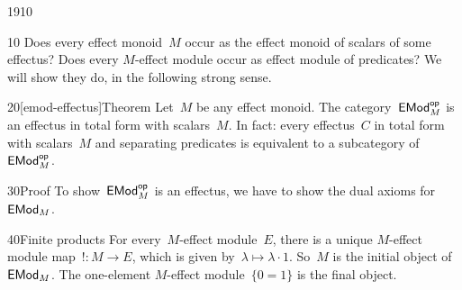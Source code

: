 \begin{parsec}{1910}%
\begin{point}{10}%
Does every effect monoid~$M$ occur as the effect monoid of scalars of some
    effectus?  Does every $M$-effect module occur as
        effect module of predicates?
We will show they do, in the following strong sense.
\end{point}
\begin{point}{20}[emod-effectus]{Theorem}%
    Let~$M$ be any effect monoid.
    The category~$\mathsf{EMod}^{\mathsf{op}}_M$ is an effectus in total form
        with scalars~$M$.
In fact: every effectus~$C$ in total form
    with scalars~$M$ and separating predicates
    is equivalent to a subcategory of~$\mathsf{EMod}^{\mathsf{op}}_M$.
\begin{point}{30}{Proof}%
To show~$\mathsf{EMod}^{\mathsf{op}}_M$ is an effectus,
    we have to show the dual  axioms for~$\mathsf{EMod}_M$.
\begin{point}{40}{Finite products}%
For every~$M$-effect module~$E$,
    there is a unique $M$-effect module map~$!\colon M \to E$,
    which is given by~$\lambda \mapsto \lambda \cdot 1$.
So~$M$ is the initial object of~$\mathsf{EMod}_M$.
The one-element $M$-effect module~$\{0=1\}$ is the final object.


\end{point}
\end{point}
\end{point}
\end{parsec}
